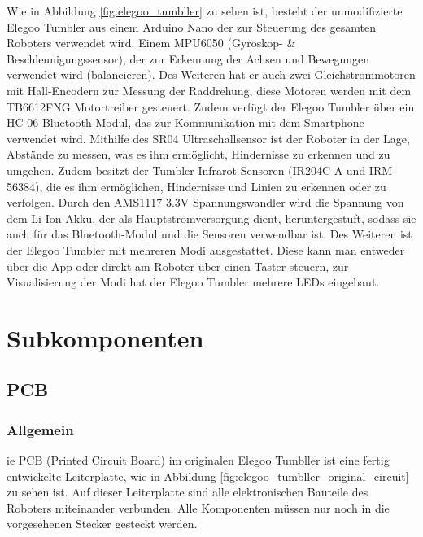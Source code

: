 Wie in Abbildung \ref{fig:elegoo_tumbller} zu sehen ist, besteht der unmodifizierte Elegoo Tumbler aus einem Arduino Nano der zur Steuerung des gesamten Roboters verwendet wird. Einem MPU6050 (Gyroskop- \& Beschleunigungssensor), der zur Erkennung der Achsen und Bewegungen verwendet wird (balancieren). Des Weiteren hat er auch zwei Gleichstrommotoren mit Hall-Encodern zur Messung der Raddrehung, diese Motoren werden mit dem TB6612FNG Motortreiber gesteuert. Zudem verfügt der Elegoo Tumbler über ein HC-06 Bluetooth-Modul, das zur Kommunikation mit dem Smartphone verwendet wird. Mithilfe des SR04 Ultraschallsensor ist der Roboter in der Lage, Abstände zu messen, was es ihm ermöglicht, Hindernisse zu erkennen und zu umgehen. Zudem besitzt der Tumbler Infrarot-Sensoren (IR204C-A und IRM-56384), die es ihm ermöglichen, Hindernisse und Linien zu erkennen oder zu verfolgen. Durch den AMS1117 3.3V Spannungswandler wird die Spannung von dem Li-Ion-Akku, der als Hauptstromversorgung dient, heruntergestuft, sodass sie auch für das Bluetooth-Modul und die Sensoren verwendbar ist. Des Weiteren ist der Elegoo Tumbler mit mehreren Modi ausgestattet. Diese kann man entweder über die App oder direkt am Roboter über einen Taster steuern, zur Visualisierung der Modi hat der Elegoo Tumbler mehrere LEDs eingebaut.
\section{Subkomponenten}
\label{subsec:subkomponenten}
%
\subsection{PCB}
%
\subsubsection{Allgemein}
ie PCB (Printed Circuit Board) im originalen Elegoo Tumbller ist eine fertig entwickelte Leiterplatte, wie in Abbildung \ref{fig:elegoo_tumbller_original_circuit} zu sehen ist.
Auf dieser Leiterplatte sind alle elektronischen Bauteile des Roboters miteinander verbunden.
Alle Komponenten müssen nur noch in die vorgesehenen Stecker gesteckt werden.
